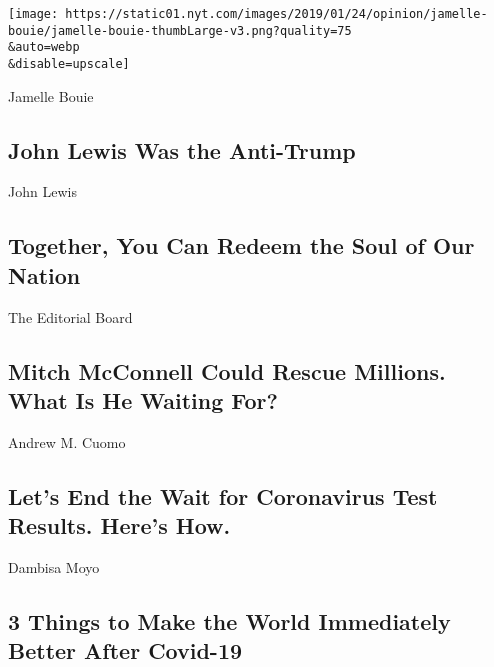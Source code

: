 \href{/2020/07/31/opinion/john-lewis-trump-election-2020.html}{}

\texttt{[image: https://static01.nyt.com/images/2019/01/24/opinion/jamelle-bouie/jamelle-bouie-thumbLarge-v3.png?quality=75\\\&auto=webp\\\&disable=upscale]}

Jamelle Bouie

\hypertarget{john-lewis-was-the-anti-trump}{%
\subsection{John Lewis Was the
Anti-Trump}\label{john-lewis-was-the-anti-trump}}

\href{/2020/07/30/opinion/john-lewis-civil-rights-america.html}{}

John Lewis

\hypertarget{together-you-can-redeem-the-soul-of-our-nation}{%
\subsection{Together, You Can Redeem the Soul of Our
Nation}\label{together-you-can-redeem-the-soul-of-our-nation}}

\href{/2020/07/30/opinion/mitch-mcconnell-coronavirus-economy.html}{}

The Editorial Board

\hypertarget{mitch-mcconnell-could-rescue-millions-what-is-he-waiting-for}{%
\subsection{Mitch McConnell Could Rescue Millions. What Is He Waiting
For?}\label{mitch-mcconnell-could-rescue-millions-what-is-he-waiting-for}}

\href{/2020/07/31/opinion/coronavirus-testing-cuomo.html}{}

Andrew M. Cuomo

\hypertarget{lets-end-the-wait-for-coronavirus-test-results-heres-how}{%
\subsection{Let's End the Wait for Coronavirus Test Results. Here's
How.}\label{lets-end-the-wait-for-coronavirus-test-results-heres-how}}

\href{/2020/07/31/opinion/coronavirus-economy.html}{}

Dambisa Moyo

\hypertarget{3-things-to-make-the-world-immediately-better-after-covid-19}{%
\subsection{3 Things to Make the World Immediately Better After
Covid-19}\label{3-things-to-make-the-world-immediately-better-after-covid-19}}

